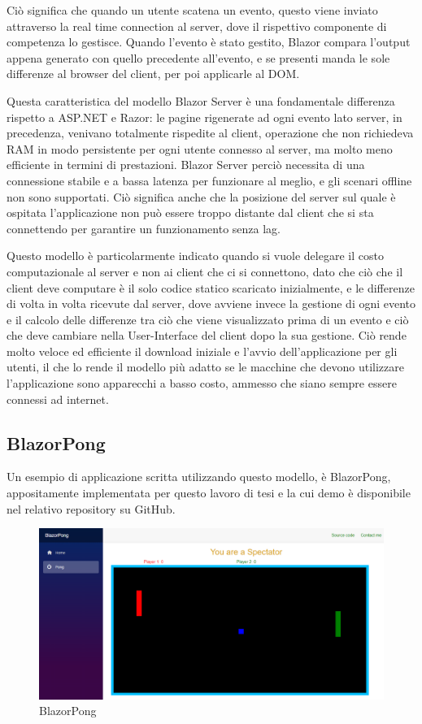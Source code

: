 Ci\`o significa che quando un utente scatena un evento, questo viene inviato attraverso la real time connection al server, dove il rispettivo componente di competenza lo gestisce.
Quando l'evento \`e stato gestito, Blazor compara l'output appena generato con quello precedente all'evento, e se presenti manda le sole differenze al browser del client, per poi applicarle al DOM\cite{blazorModelsScenarios}.

Questa caratteristica del modello Blazor Server \`e una fondamentale differenza rispetto a ASP.NET e Razor: le pagine rigenerate ad ogni evento lato server, in precedenza, venivano totalmente rispedite al client, operazione che non richiedeva RAM in modo persistente per ogni utente connesso al server, ma molto meno efficiente in termini di prestazioni.
Blazor Server perci\`o necessita di una connessione stabile e a bassa latenza per funzionare al meglio, e gli scenari offline non sono supportati.
Ci\`o significa anche che la posizione del server sul quale \`e ospitata l'applicazione non pu\`o essere troppo distante dal client che si sta connettendo per garantire un funzionamento senza lag.

Questo modello \`e particolarmente indicato quando si vuole delegare il costo computazionale al server e non ai client che ci si connettono, dato che ci\`o che il client deve computare \`e il solo codice statico scaricato inizialmente, e le differenze di volta in volta ricevute dal server, dove avviene invece la gestione di ogni evento e il calcolo delle differenze tra ci\`o che viene visualizzato prima di un evento e ci\`o che deve cambiare nella User-Interface del client dopo la sua gestione.
Ci\`o rende molto veloce ed efficiente il download iniziale e l'avvio dell'applicazione per gli utenti, il che lo rende il modello pi\`u adatto se le macchine che devono utilizzare l'applicazione sono apparecchi a basso costo, ammesso che siano sempre essere connessi ad internet.

\subsection{BlazorPong }\label{sez:bpong}
Un esempio di applicazione scritta utilizzando questo modello, \`e BlazorPong, appositamente implementata per questo lavoro di tesi e la cui demo \`e disponibile nel relativo repository su GitHub\cite{blazorPong}.

\begin{figure}[H]
	\centerline{\includegraphics[scale=0.3]{figure/BlazorPong.PNG}}
	\caption{BlazorPong}
	\label{fig:BlazorPong}
\end{figure}

